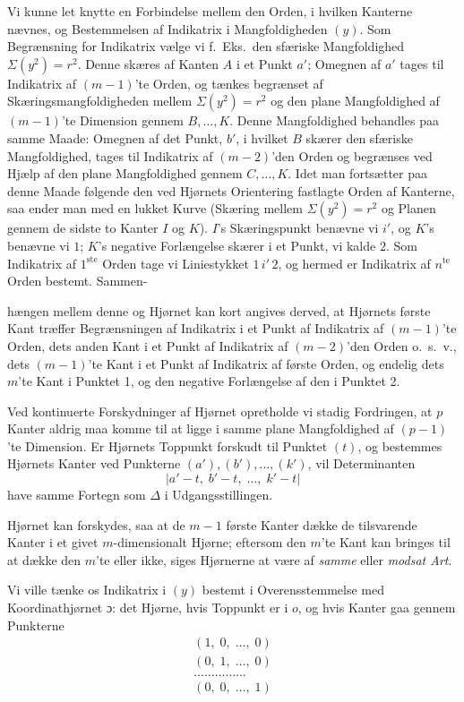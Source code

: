 \documentclass{article}
\begin{document}
Vi kunne let knytte en Forbindelse mellem den Orden, i hvilken Kanterne nævnes, og Bestemmelsen af Indikatrix i Mangfoldigheden $(y)$. Som Begrænsning for Indikatrix vælge vi f.~Eks.\ den sfæriske Mangfoldighed $\Sigma(y^2) = r^2$. Denne skæres af Kanten $A$ i et Punkt $a'$; Omegnen af $a'$ tages til Indikatrix af $(m - 1)$'te Orden, og tænkes begrænset af Skæringsmangfoldigheden mellem $\Sigma(y^2) = r^2$ og den plane Mangfoldighed af $(m - 1)$'te Dimension gennem $B, \dots, K$. Denne Mangfoldighed behandles paa samme Maade: Omegnen af det Punkt, $b'$, i hvilket $B$ skærer den sfæriske Mangfoldighed, tages til Indikatrix af $(m - 2)$'den Orden og begrænses ved Hjælp af den plane Mangfoldighed gennem $C, \dots, K$. Idet man fortsætter paa denne Maade følgende den ved Hjørnets Orientering fastlagte Orden af Kanterne, saa ender man med en lukket Kurve (Skæring mellem $\Sigma(y^2) = r^2$ og Planen gennem de sidste to Kanter $I$ og $K$). $I$'s Skæringspunkt benævne vi $i'$, og $K$'s benævne vi $1$; $K$'s negative Forlængelse skærer i et Punkt, vi kalde $2$. Som Indikatrix af $1^{\text{ste}}$ Orden tage vi Liniestykket $1\,i'\,2$, og hermed er Indikatrix af $n^{\text{te}}$ Orden bestemt. Sammen-

hængen mellem denne og Hjørnet kan kort angives derved, at Hjørnets første Kant træffer Begrænsningen af Indikatrix i et Punkt af Indikatrix af $(m - 1)$'te Orden, dets anden Kant i et Punkt af Indikatrix af $(m - 2)$'den Orden o.~s.~v., dets $(m - 1)$'te Kant i et Punkt af Indikatrix af første Orden, og endelig dets $m$'te Kant i Punktet 1, og den negative Forlængelse af den i Punktet 2.

Ved kontinuerte Forskydninger af Hjørnet opretholde vi stadig Fordringen, at $p$ Kanter aldrig maa komme til at ligge i samme plane Mangfoldighed af $(p - 1)$'te Dimension. Er Hjørnets Toppunkt forskudt til Punktet $(t)$, og bestemmes Hjørnets Kanter ved Punkterne $(a'), (b'), \dots, (k')$, vil Determinanten
\[
|a' - t, \; b' - t, \; \dots, \; k' - t|
\]
have samme Fortegn som $\Delta$ i Udgangsstillingen.

Hjørnet kan forskydes, saa at de $m - 1$ første Kanter dække de tilsvarende Kanter i et givet $m$-dimensionalt Hjørne; eftersom den $m$'te Kant kan bringes til at dække den $m$'te eller ikke, siges Hjørnerne at være af \emph{samme} eller \emph{modsat Art}.

Vi ville tænke os Indikatrix i $(y)$ bestemt i Overensstemmelse med Koordinathjørnet ɔ: det Hjørne, hvis Toppunkt er i $o$, og hvis Kanter gaa gennem Punkterne
\[
\begin{gathered}
(1, \; 0, \; \dots, \; 0) \\
(0, \; 1, \; \dots, \; 0) \\
\dots\dots\dots\dots\dots \\
(0, \; 0, \; \dots, \; 1)
\end{gathered}
\]
\end{document}
